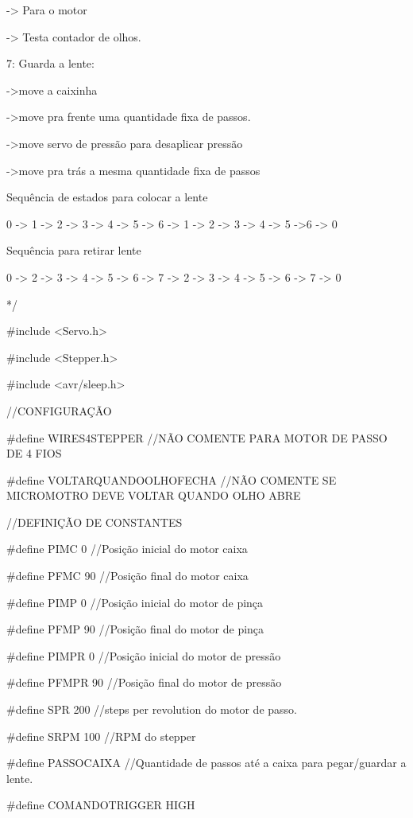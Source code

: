 \begin{apendicesenv}
             -> Para o motor

             -> Testa contador de olhos. 
    
    7: Guarda a lente:

               ->move a caixinha

               ->move pra frente uma quantidade fixa de passos.

               ->move servo de pressão para desaplicar pressão

               ->move pra trás a mesma quantidade fixa de passos
    
   Sequência de estados para colocar a lente

         0 -> 1 -> 2 -> 3 -> 4 -> 5 -> 6 -> 1 -> 2 -> 3 -> 4 -> 5 ->6 -> 0

   Sequência para retirar lente      

         0 -> 2 -> 3 -> 4 -> 5 -> 6 -> 7 -> 2 -> 3 -> 4 -> 5 -> 6 -> 7 -> 0
     
              
*/

\#include <Servo.h>

\#include <Stepper.h>

\#include <avr/sleep.h>


//CONFIGURAÇÃO

\#define WIRES4STEPPER          //NÃO COMENTE PARA MOTOR DE PASSO DE 4 FIOS

\#define VOLTARQUANDOOLHOFECHA  //NÃO COMENTE SE MICROMOTRO DEVE VOLTAR QUANDO OLHO ABRE


//DEFINIÇÃO DE CONSTANTES

\#define PIMC 0          //Posição inicial do motor caixa

\#define PFMC 90         //Posição final do motor caixa

\#define PIMP 0          //Posição inicial do motor de pinça

\#define PFMP 90         //Posição final do motor de pinça

\#define PIMPR 0         //Posição inicial do motor de pressão

\#define PFMPR 90        //Posição final do motor de pressão

\#define SPR 200         //steps per revolution do motor de passo.

\#define SRPM 100        //RPM do stepper

\#define PASSOCAIXA      //Quantidade de passos até a caixa para pegar/guardar a lente.

\#define COMANDOTRIGGER HIGH


\end{apendicesenv}
